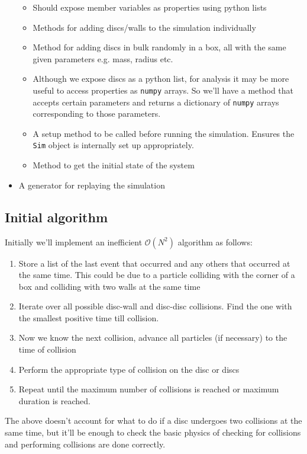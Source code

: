 \documentclass{article}
\begin{document}
\begin{itemize}
    \begin{itemize}
        \item Should expose member variables as properties using python lists
        \item Methods for adding discs/walls to the simulation individually
        \item Method for adding discs in bulk randomly in a box, all with the same given parameters e.g. mass, radius etc. 
        \item Although we expose discs as a python list, for analysis it may be more useful to access properties as \texttt{numpy} arrays. So we'll have a method that accepts certain parameters and returns a dictionary of \texttt{numpy} arrays corresponding to those parameters.
        \item A setup method to be called before running the simulation. Ensures the \texttt{Sim} object is internally set up appropriately.
        \item Method to get the initial state of the system
    \end{itemize}
    \item A generator for replaying the simulation
\end{itemize}

\subsection{Initial algorithm}
Initially we'll implement an inefficient $\mathcal{O}(N^2)$ algorithm as follows:
\begin{enumerate}
    \item Store a list of the last event that occurred and any others that occurred at the same time. This could be due to a particle colliding with the corner of a box and colliding with two walls at the same time
    \item Iterate over all possible disc-wall and disc-disc collisions. Find the one with the smallest positive time till collision.
    \item Now we know the next collision, advance all particles (if necessary) to the time of collision
    \item Perform the appropriate type of collision on the disc or discs
    \item Repeat until the maximum number of collisions is reached or maximum duration is reached.
\end{enumerate}
The above doesn't account for what to do if a disc undergoes two collisions at the same time, but it'll be enough to check the basic physics of checking for collisions and performing collisions are done correctly.
\end{document}
